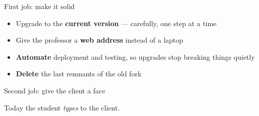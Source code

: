 \documentclass[aspectratio=169,11pt]{beamer}
\newcommand{\hl}[1]{\textcolor{ffcBlue}{\textbf{#1}}}
\begin{document}
\begin{frame}{First job: make it solid}
  \vspace{1.6em}
  \begin{center}
  \begin{minipage}{0.86\textwidth}\large
    \begin{itemize}\setlength{\itemsep}{0.95em}
      \item<1-> Upgrade to the \hl{current version} --- carefully, one step at a time
      \item<2-> Give the professor a \hl{web address} instead of a laptop
      \item<3-> \hl{Automate} deployment and testing, so upgrades stop breaking things quietly
      \item<4-> \hl{Delete} the last remnants of the old fork
    \end{itemize}
  \end{minipage}
  \end{center}
  \vfill
\end{frame}

\begin{frame}{Second job: give the client a face}
  \vfill
  \begin{center}
    {\Large Today the student \emph{types} to the client.}\\[1.3em]
    {\Huge\bfseries\color{ffcTeal} }\\[1.3em]
    {\Large {}}
  \end{center}
  \vfill
  \begin{center}\large
  \end{center}
  \vfill
\end{frame}
\end{document}
